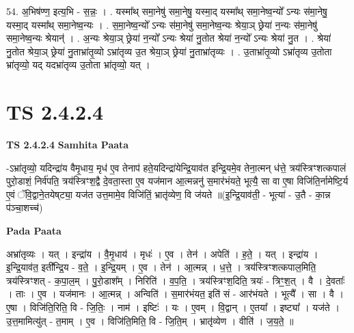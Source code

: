 \documentclass[17pt]{extarticle}
\begin{document}
54. अ॒भिष॑ण्ण॒ इत्य॒भि - स॒न्नः॒ । . यस्मा᳚थ् समा॒नेषु॑ समा॒नेषु॒ यस्मा॒द् यस्मा᳚थ् समा॒नेष्व॒न्यो᳚ ऽन्यः स॑मा॒नेषु॒ यस्मा॒द् यस्मा᳚थ् समा॒नेष्व॒न्यः । . स॒मा॒नेष्व॒न्यो᳚ ऽन्यः स॑मा॒नेषु॑ समा॒नेष्व॒न्यः श्रेया॒ञ् छ्रेया॑ न॒न्यः स॑मा॒नेषु॑ समा॒नेष्व॒न्यः श्रेयान्॑ । . अ॒न्यः श्रेया॒ञ् छ्रेया॑ न॒न्यो᳚ ऽन्यः श्रेया॑ नु॒तोत श्रेया॑ न॒न्यो᳚ ऽन्यः श्रेया॑ नु॒त । . श्रेया॑ नु॒तोत श्रेया॒ञ् छ्रेया॑ नु॒ताभ्रा॑तृ॒व्यो ऽभ्रा॑तृव्य उ॒त श्रेया॒ञ् छ्रेया॑ नु॒ताभ्रा॑तृव्यः । . उ॒ताभ्रा॑तृ॒व्यो ऽभ्रा॑तृव्य उ॒तोता भ्रा॑तृव्यो॒ यद् यदभ्रा॑तृव्य उ॒तोता भ्रा॑तृव्यो॒ यत् । \newline
\pagebreak
{}
\section*{ TS 2.4.2.4 }

\textbf{TS 2.4.2.4 } \newline
\textbf{Samhita Paata} \newline

-ऽभ्रा॑तृव्यो॒ यदिन्द्रा॑य वैमृ॒धाय॒ मृध॑ ए॒व तेनाप॑ हते॒यदिन्द्रा॑येन्द्रि॒याव॑त इन्द्रि॒यमे॒व तेना॒त्मन् ध॑त्ते॒ त्रय॑स्त्रिꣳशत्कपालं पुरो॒डाशं॒ निर्व॑पति॒ त्रय॑स्त्रिꣳश॒द्वै दे॒वता॒स्ता ए॒व यज॑मान आ॒त्मन्ननु॑ स॒मार॑भंयते॒ भूत्यै॒ सा वा ए॒षा विजि॑ति॒र्नामेष्टि॒र्य ए॒वं ॅवि॒द्वाने॒तयेष्‌ट्या॒ यज॑त उत्त॒मामे॒व विजि॑तिं॒ भ्रातृ॑व्येण॒ वि ज॑यते ॥(इ॒न्द्रि॒याव॑ती॒ - भूत्या॑ - उ॒तै - का॒न्न प॑ञ्चा॒शच्च॑) \newline

\textbf{Pada Paata} \newline

अभ्रा॑तृव्यः । यत् । इन्द्रा॑य । वै॒मृ॒धाय॑ । मृधः॑ । ए॒व । तेन॑ । अपेति॑ । ह॒ते॒ । यत् । इन्द्रा॑य । इ॒न्द्रि॒याव॑त॒ इती᳚न्द्रि॒य - व॒ते॒ । इ॒न्द्रि॒यम् । ए॒व । तेन॑ । आ॒त्मन्न् । ध॒त्ते॒ । त्रय॑स्त्रिꣳशत्कपाल॒मिति॒ त्रय॑स्त्रिꣳशत् - क॒पा॒ल॒म् । पु॒रो॒डाश᳚म् । निरिति॑ । व॒प॒ति॒ । त्रय॑स्त्रिꣳश॒दिति॒ त्रयः॑ - त्रिꣳ॒॒श॒त् । वै । दे॒वताः᳚ । ताः । ए॒व । यज॑मानः । आ॒त्मन्न् । अन्विति॑ । स॒मार॑भंयत॒ इति॑ सं - आर॑भंयते । भूत्यै᳚ । सा । वै । ए॒षा । विजि॑ति॒रिति॒ वि - जि॒तिः॒ । नाम॑ । इष्टिः॑ । यः । ए॒वम् । वि॒द्वान् । ए॒तया᳚ । इष्ट्या᳚ । यज॑ते । उ॒त्त॒मामित्यु॑त् - त॒माम् । ए॒व । विजि॑ति॒मिति॒ वि - जि॒ति॒म् । भ्रातृ॑व्येण । वीति॑ । ज॒य॒ते॒ ॥  \newline
\end{document}
